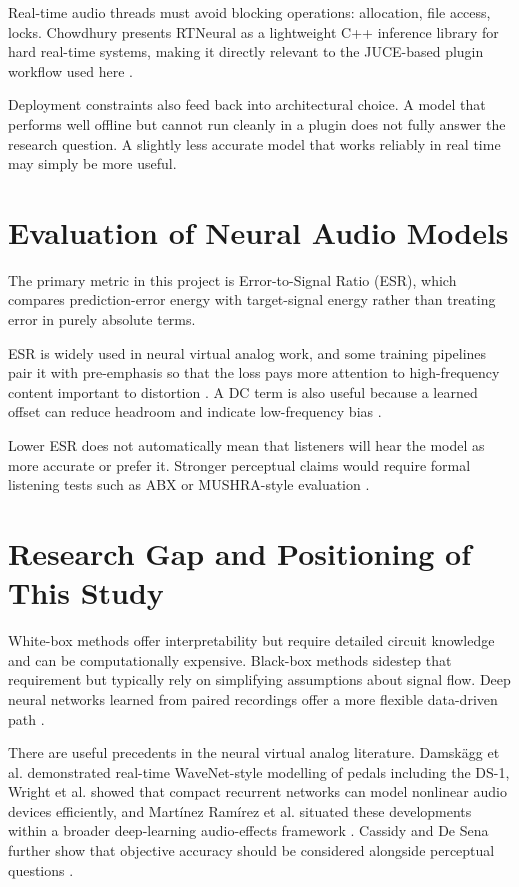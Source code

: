 Real-time audio threads must avoid blocking operations: allocation, file access, locks. Chowdhury presents RTNeural as a lightweight C++ inference library for hard real-time systems, making it directly relevant to the JUCE-based plugin workflow used here \cite{chowdhury_rtneural_2021}.

Deployment constraints also feed back into architectural choice. A model that performs well offline but cannot run cleanly in a plugin does not fully answer the research question. A slightly less accurate model that works reliably in real time may simply be more useful.

\section{Evaluation of Neural Audio Models}

The primary metric in this project is Error-to-Signal Ratio (ESR), which compares prediction-error energy with target-signal energy rather than treating error in purely absolute terms.

ESR is widely used in neural virtual analog work, and some training pipelines pair it with pre-emphasis so that the loss pays more attention to high-frequency content important to distortion \cite{wright_real-time_2019,cassidy_perceptual_2023}. A DC term is also useful because a learned offset can reduce headroom and indicate low-frequency bias \cite{wright_real-time_2019}.

Lower ESR does not automatically mean that listeners will hear the model as more accurate or prefer it. Stronger perceptual claims would require formal listening tests such as ABX or MUSHRA-style evaluation \cite{ITU_BS1534_3,cassidy_perceptual_2023}.

\section{Research Gap and Positioning of This Study}

White-box methods offer interpretability but require detailed circuit knowledge and can be computationally expensive. Black-box methods sidestep that requirement but typically rely on simplifying assumptions about signal flow. Deep neural networks learned from paired recordings offer a more flexible data-driven path \cite{yeh_simplified_2007,martinez_ramirez_deep_2020}.

There are useful precedents in the neural virtual analog literature. Damskägg et al. demonstrated real-time WaveNet-style modelling of pedals including the DS-1, Wright et al. showed that compact recurrent networks can model nonlinear audio devices efficiently, and Martínez Ramírez et al. situated these developments within a broader deep-learning audio-effects framework \cite{wright_real-time_2019,martinez_ramirez_deep_2020}. Cassidy and De Sena further show that objective accuracy should be considered alongside perceptual questions \cite{cassidy_perceptual_2023}.

